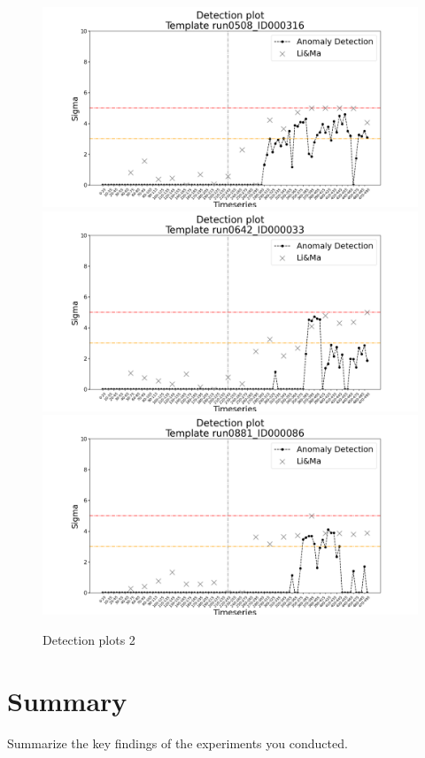 \begin{figure}
    \includegraphics[width=1\textwidth]{figures/experiments/detection_plots/detection_plot_run0508_ID000316_testset_e.png}\hfill
    \\[\smallskipamount]

    \includegraphics[width=1\textwidth]{figures/experiments/detection_plots/detection_plot_run0642_ID000033_testset_e.png}\hfill
    \\[\smallskipamount]
    
    \includegraphics[width=1\textwidth]{figures/experiments/detection_plots/detection_plot_run0881_ID000086_testset_e.png}\hfill
    \\[\smallskipamount]
    \caption{Detection plots 2}\label{fig:detection-plots-2}
\end{figure}

\section{Summary}
\label{s:Experiments-Summary}

Summarize the key findings of the experiments you conducted.
